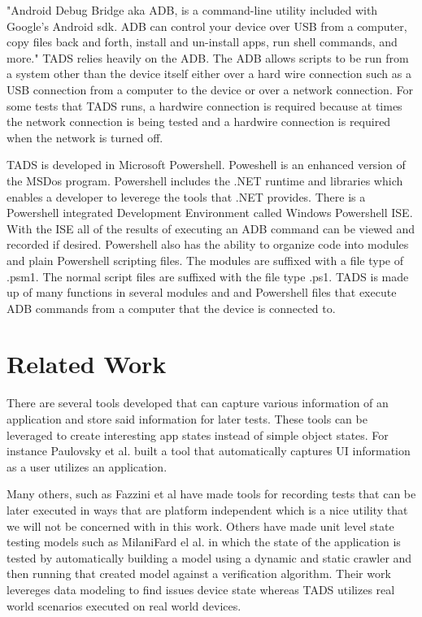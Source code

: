 "Android Debug Bridge aka ADB, is a command-line utility included with Google's Android sdk. ADB can control your device over USB from a computer, copy files back and forth, install and un-install apps, run shell commands, and more." \cite{hoffman2017}  TADS relies heavily on the ADB. The ADB allows scripts to be run from a system other than the device itself either over a hard wire connection such as a USB connection from a computer to the device or over a network connection.  For some tests that TADS runs, a hardwire connection is required because at times the network connection is being tested and a hardwire connection is required when the network is turned off.  

TADS is developed in Microsoft Powershell.  Poweshell is an enhanced version of the MSDos program.  Powershell includes the .NET runtime and libraries which enables a developer to leverege the tools that .NET provides.  There is a Powershell integrated Development Environment called Windows Powershell ISE.  With the ISE all of the results of executing an ADB command can be viewed and recorded if desired.  Powershell also has the ability to organize code into modules and plain Powershell scripting files.  The modules are suffixed with a file type of .psm1.  The normal script files are suffixed with the file type .ps1.  TADS is made up of many functions in several modules and and Powershell files that execute ADB commands from a computer that the device is connected to.   


\section{Related Work}
There are several tools developed that can capture various information of an application and store said information for later tests.  These tools can be leveraged to create interesting app states instead of simple object states.  For instance Paulovsky et al. \cite{7962332} built a tool that automatically captures UI information as a user utilizes an application. 

Many others, such as Fazzini et al \cite{7927971} have made tools for recording tests that can be later executed in ways that are platform independent which is a nice utility that we will not be concerned with in this work.  Others have made unit level state testing models such as MilaniFard el al. \cite{MilaniFard:2014:LET:2642937.2642991} in which the state of the application is tested by automatically building a model using a dynamic and static crawler and then running that created model against a verification algorithm.  Their work levereges data modeling to find issues device state whereas TADS utilizes real world scenarios executed on real world devices.  


